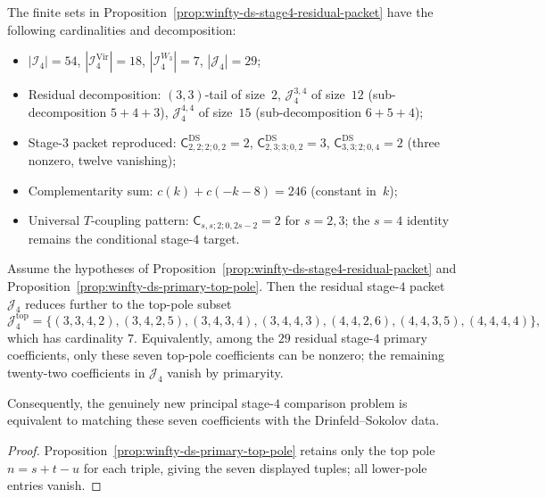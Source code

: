 \begin{computation}
\label{comp:winfty-stage4-seed-check}
The finite sets in
Proposition~\ref{prop:winfty-ds-stage4-residual-packet} have the
following cardinalities and decomposition:
\begin{itemize}
\item $|\mathcal{I}_4| = 54$,
 $|\mathcal{I}_4^{\mathrm{Vir}}| = 18$,
 $|\mathcal{I}_4^{W_3}| = 7$,
 $|\mathcal{J}_4| = 29$;
\item Residual decomposition: $(3,3)$-tail of size~$2$,
 $\mathcal{J}_4^{3,4}$ of size~$12$ (sub-decomposition $5+4+3$),
 $\mathcal{J}_4^{4,4}$ of size~$15$ (sub-decomposition $6+5+4$);
\item Stage-$3$ packet reproduced:
 $\mathsf{C}^{\mathrm{DS}}_{2,2;2;0,2} = 2$,
 $\mathsf{C}^{\mathrm{DS}}_{2,3;3;0,2} = 3$,
 $\mathsf{C}^{\mathrm{DS}}_{3,3;2;0,4} = 2$ (three nonzero,
 twelve vanishing);
\item Complementarity sum:
 $c(k) + c(-k-8) = 246$ (constant in~$k$);
\item Universal $T$-coupling pattern:
 $\mathsf{C}_{s,s;2;0,2s-2} = 2$ for $s = 2, 3$;
 the $s=4$ identity remains the conditional stage-$4$ target.
\end{itemize}
\end{computation}

\begin{corollary}
\label{cor:winfty-ds-stage4-top-pole-packet}
Assume the hypotheses of
Proposition~\ref{prop:winfty-ds-stage4-residual-packet} and
Proposition~\ref{prop:winfty-ds-primary-top-pole}. Then the residual
stage-$4$ packet $\mathcal{J}_4$ reduces further to the top-pole subset
\[
\mathcal{J}_4^{\mathrm{top}}
=\{(3,3,4,2),(3,4,2,5),(3,4,3,4),(3,4,4,3),
(4,4,2,6),(4,4,3,5),(4,4,4,4)\},
\]
which has cardinality $7$. Equivalently, among the $29$ residual
stage-$4$ primary coefficients, only these seven top-pole coefficients
can be nonzero; the remaining twenty-two coefficients in
$\mathcal{J}_4$ vanish by primaryity.

Consequently, the genuinely new principal stage-$4$ comparison problem
is equivalent to matching these seven coefficients with the
Drinfeld--Sokolov data.
\end{corollary}

\begin{proof}
Proposition~\ref{prop:winfty-ds-primary-top-pole} retains only the top pole $n=s+t-u$ for each triple, giving the seven displayed tuples; all lower-pole entries vanish.
\end{proof}

